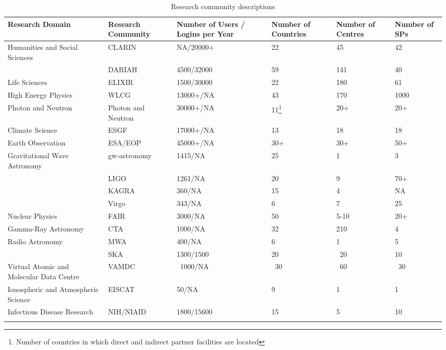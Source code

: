 \documentclass[fleqn,10pt]{wlscirep}
\begin{document}
{\begin{center}
\begin{longtable}{|p{5cm}|*{5}{p{}|}} 
\hline
Research Domain & Research Community & Number of Users / Logins per Year & Number of Countries & Number of Centres & Number of SPs \\
\hline \hline
\endhead
\hline
Humanities and Social Sciences & CLARIN & NA/20000+ & 22 & 45 & 42 \\
\cline{2-6}
& DARIAH & 4500/32000 & 59 & 141 & 40\\
\hline
Life Sciences& ELIXIR&1500/30000&22&180&61\\
\hline
High Energy Physics&WLCG&13000+/NA&43&170&1000\\
\hline
Photon and Neutron&Photon and Neutron&30000+/NA&11\footnote{Number of countries in which direct and indirect partner facilities are located}&20+&20+\\
\hline
Climate Science&ESGF& 17000+/NA&13&18&18\\
\hline
Earth Observation&ESA/EOP&45000+/NA&30+&30+&50+\\
\hline
Gravitational Wave Astronomy&gw-astronomy&1415/NA&25&1&3\\
\cline{2-6}
&LIGO&1261/NA&20&9&70+\\
\cline{2-6}
&KAGRA&360/NA&15&4&NA\\
\cline{2-6}
&Virgo&343/NA&6&7&25\\
\hline
Nuclear Physics&FAIR&3000/NA&50&5-10&20+\\
\hline
Gamma-Ray Astronomy&CTA& 1000/NA&32&210&4\\
\hline
Radio Astronomy&MWA&400/NA&6&1&5\\
\cline{2-6}
&SKA&1300/1500&20&~20&10\\
\hline
Virtual Atomic and Molecular Data Centre&VAMDC&~1000/NA&~30&~60&~30\\
\hline
Ionospheric and Atmospheric Science&EISCAT&50/NA&9&1&1\\
\hline
Infectious Disease Research&NIH/NIAID&1800/15600&15&5&10\\
\hline
\caption{Research community descriptions}
\label{tab:table1}
\end{longtable}
\end{center}

}
\end{document}
